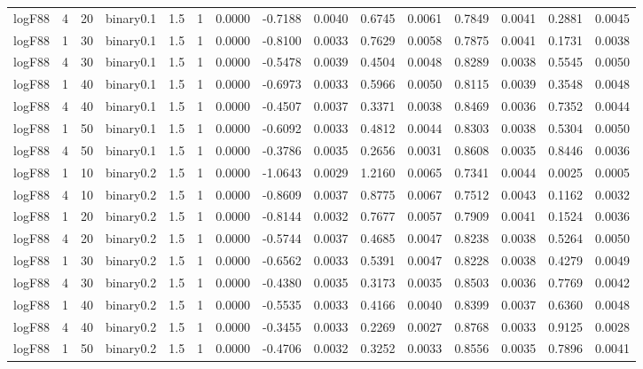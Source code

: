 \begin{longtable}{rrrrrrrrrrrrrrr}
  logF88 & 4 & 20 & binary0.1 & 1.5 & 1 & 0.0000 & -0.7188 & 0.0040 & 0.6745 & 0.0061 & 0.7849 & 0.0041 & 0.2881 & 0.0045 \\ 
  logF88 & 1 & 30 & binary0.1 & 1.5 & 1 & 0.0000 & -0.8100 & 0.0033 & 0.7629 & 0.0058 & 0.7875 & 0.0041 & 0.1731 & 0.0038 \\ 
  logF88 & 4 & 30 & binary0.1 & 1.5 & 1 & 0.0000 & -0.5478 & 0.0039 & 0.4504 & 0.0048 & 0.8289 & 0.0038 & 0.5545 & 0.0050 \\ 
  logF88 & 1 & 40 & binary0.1 & 1.5 & 1 & 0.0000 & -0.6973 & 0.0033 & 0.5966 & 0.0050 & 0.8115 & 0.0039 & 0.3548 & 0.0048 \\ 
  logF88 & 4 & 40 & binary0.1 & 1.5 & 1 & 0.0000 & -0.4507 & 0.0037 & 0.3371 & 0.0038 & 0.8469 & 0.0036 & 0.7352 & 0.0044 \\ 
  logF88 & 1 & 50 & binary0.1 & 1.5 & 1 & 0.0000 & -0.6092 & 0.0033 & 0.4812 & 0.0044 & 0.8303 & 0.0038 & 0.5304 & 0.0050 \\ 
  logF88 & 4 & 50 & binary0.1 & 1.5 & 1 & 0.0000 & -0.3786 & 0.0035 & 0.2656 & 0.0031 & 0.8608 & 0.0035 & 0.8446 & 0.0036 \\ 
  logF88 & 1 & 10 & binary0.2 & 1.5 & 1 & 0.0000 & -1.0643 & 0.0029 & 1.2160 & 0.0065 & 0.7341 & 0.0044 & 0.0025 & 0.0005 \\ 
  logF88 & 4 & 10 & binary0.2 & 1.5 & 1 & 0.0000 & -0.8609 & 0.0037 & 0.8775 & 0.0067 & 0.7512 & 0.0043 & 0.1162 & 0.0032 \\ 
  logF88 & 1 & 20 & binary0.2 & 1.5 & 1 & 0.0000 & -0.8144 & 0.0032 & 0.7677 & 0.0057 & 0.7909 & 0.0041 & 0.1524 & 0.0036 \\ 
  logF88 & 4 & 20 & binary0.2 & 1.5 & 1 & 0.0000 & -0.5744 & 0.0037 & 0.4685 & 0.0047 & 0.8238 & 0.0038 & 0.5264 & 0.0050 \\ 
  logF88 & 1 & 30 & binary0.2 & 1.5 & 1 & 0.0000 & -0.6562 & 0.0033 & 0.5391 & 0.0047 & 0.8228 & 0.0038 & 0.4279 & 0.0049 \\ 
  logF88 & 4 & 30 & binary0.2 & 1.5 & 1 & 0.0000 & -0.4380 & 0.0035 & 0.3173 & 0.0035 & 0.8503 & 0.0036 & 0.7769 & 0.0042 \\ 
  logF88 & 1 & 40 & binary0.2 & 1.5 & 1 & 0.0000 & -0.5535 & 0.0033 & 0.4166 & 0.0040 & 0.8399 & 0.0037 & 0.6360 & 0.0048 \\ 
  logF88 & 4 & 40 & binary0.2 & 1.5 & 1 & 0.0000 & -0.3455 & 0.0033 & 0.2269 & 0.0027 & 0.8768 & 0.0033 & 0.9125 & 0.0028 \\ 
  logF88 & 1 & 50 & binary0.2 & 1.5 & 1 & 0.0000 & -0.4706 & 0.0032 & 0.3252 & 0.0033 & 0.8556 & 0.0035 & 0.7896 & 0.0041 \\ 

\end{longtable}
